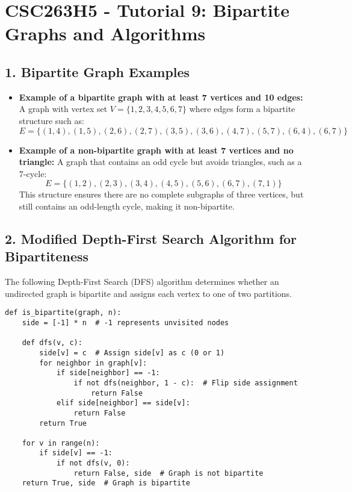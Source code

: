 \documentclass[12pt]{article}
\begin{document}
\renewcommand{\familydefault}{\rmdefault}

\section*{CSC263H5 - Tutorial 9: Bipartite Graphs and Algorithms}

\subsection*{1. Bipartite Graph Examples}
\begin{itemize}
    \item \textbf{Example of a bipartite graph with at least 7 vertices and 10 edges:} A graph with vertex set \( V = \{1,2,3,4,5,6,7\} \) where edges form a bipartite structure such as:
    \[
    E = \{(1,4), (1,5), (2,6), (2,7), (3,5), (3,6), (4,7), (5,7), (6,4), (6,7)\}
    \]
    \item \textbf{Example of a non-bipartite graph with at least 7 vertices and no triangle:} A graph that contains an odd cycle but avoids triangles, such as a 7-cycle:
    \[
    E = \{(1,2), (2,3), (3,4), (4,5), (5,6), (6,7), (7,1)\}
    \]
    This structure ensures there are no complete subgraphs of three vertices, but still contains an odd-length cycle, making it non-bipartite.
\end{itemize}

\subsection*{2. Modified Depth-First Search Algorithm for Bipartiteness}
The following Depth-First Search (DFS) algorithm determines whether an undirected graph is bipartite and assigns each vertex to one of two partitions.

\begin{lstlisting}
def is_bipartite(graph, n):
    side = [-1] * n  # -1 represents unvisited nodes
    
    def dfs(v, c):
        side[v] = c  # Assign side[v] as c (0 or 1)
        for neighbor in graph[v]:
            if side[neighbor] == -1:
                if not dfs(neighbor, 1 - c):  # Flip side assignment
                    return False
            elif side[neighbor] == side[v]:
                return False
        return True

    for v in range(n):
        if side[v] == -1:
            if not dfs(v, 0):
                return False, side  # Graph is not bipartite
    return True, side  # Graph is bipartite
\end{lstlisting}
\end{document}
